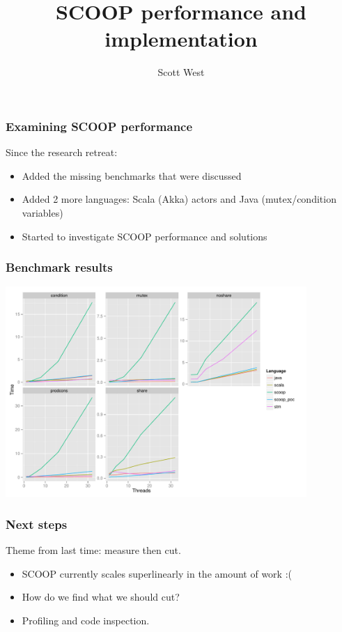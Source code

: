 \documentclass{beamer}
\title{SCOOP performance and implementation}
\author{Scott West}
\institute{ETH Z\"{u}rich}
\begin{document}
\maketitle

\begin{frame}
  \frametitle{Examining SCOOP performance}
  
  Since the research retreat:
  \begin{itemize}[<+->]
  \item Added the missing benchmarks that were discussed
  \item Added 2 more languages: Scala (Akka) actors and Java (mutex/condition variables)
  \item Started to investigate SCOOP performance and solutions
  \end{itemize}
\end{frame}


\begin{frame}
  \frametitle{Benchmark results}
  \begin{center}
    \includegraphics[width=4.5in]{time-facet}
  \end{center}
\end{frame}


\begin{frame}
  \frametitle{Next steps}
  Theme from last time: measure then cut.
  \begin{itemize}[<+->]
  \item SCOOP currently scales superlinearly in the amount of work :(
  \item How do we find what we should cut? 
  \item Profiling and code inspection.
  \end{itemize}
\end{frame}
\end{document}
